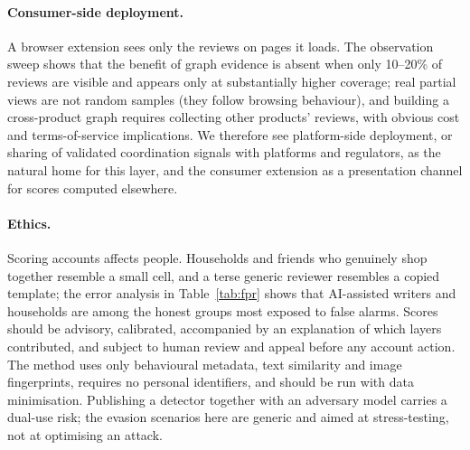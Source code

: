 \documentclass[pdflatex,sn-basic]{sn-jnl}
\theoremstyle{thmstyleone}
\theoremstyle{thmstylethree}
\begin{document}
\paragraph{Consumer-side deployment.} A browser extension sees only the reviews on pages it loads. The observation sweep shows that the benefit of graph evidence is absent when only 10--20\% of reviews are visible and appears only at substantially higher coverage; real partial views are not random samples (they follow browsing behaviour), and building a cross-product graph requires collecting other products' reviews, with obvious cost and terms-of-service implications. We therefore see platform-side deployment, or sharing of validated coordination signals with platforms and regulators, as the natural home for this layer, and the consumer extension as a presentation channel for scores computed elsewhere.

\paragraph{Ethics.} Scoring accounts affects people. Households and friends who genuinely shop together resemble a small cell, and a terse generic reviewer resembles a copied template; the error analysis in Table~\ref{tab:fpr} shows that AI-assisted writers and households are among the honest groups most exposed to false alarms. Scores should be advisory, calibrated, accompanied by an explanation of which layers contributed, and subject to human review and appeal before any account action. The method uses only behavioural metadata, text similarity and image fingerprints, requires no personal identifiers, and should be run with data minimisation. Publishing a detector together with an adversary model carries a dual-use risk; the evasion scenarios here are generic and aimed at stress-testing, not at optimising an attack.
\end{document}
